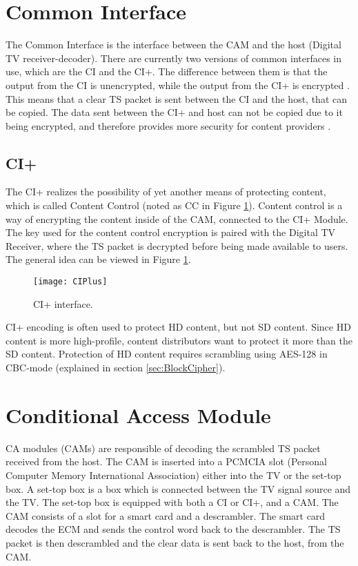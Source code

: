 \section{Common Interface} \label{sec:CI}
The Common Interface is the interface between the CAM and the host 
(Digital TV receiver-decoder). There are currently two versions of 
common interfaces in use, which are the CI and the CI+. The difference 
between them is that the output from the CI is unencrypted, while the 
output from the CI+ is encrypted \citep{CI+:2011}. This means that a 
clear TS packet is sent between the CI and the host, that can be 
copied. The data sent between the CI+ and host can not be copied due 
to it being encrypted, and therefore provides more security for 
content providers \citep{CI:1997}.

\subsection{CI+}
The CI+ realizes the possibility of yet another means of protecting 
content, which is called Content Control (noted as CC in Figure 
\ref{img:CIPlus}). Content control is a way of encrypting the content 
inside of the CAM, connected to the CI+ Module. The key used for the 
content control encryption is paired with the Digital TV Receiver, 
where the TS packet is decrypted before being made available to users. 
The general idea can be viewed in Figure \ref{img:CIPlus}.

\begin{figure}[h!]
  \centering
  \texttt{[image: CIPlus]}
  \caption{CI+ interface. \citep[p. 10]{CI+:2011}}
  \label{img:CIPlus}
\end{figure}

CI+ encoding is often used to protect HD content, but not SD 
content. Since HD content is more high-profile, content distributors 
want to protect it more than the SD content. Protection of HD content 
requires scrambling using AES-128 in CBC-mode (explained in section 
\ref{sec:BlockCipher}). \citep{CI+:2011, CI+:2011_2}

\section{Conditional Access Module}\label{sec:CAM}
CA modules (CAMs) are responsible of decoding the scrambled TS packet
received from the host. The CAM is inserted into a PCMCIA slot 
(Personal Computer Memory International Association) either into the 
TV or the set-top box. A set-top box is a box which is connected 
between the TV signal source and the TV. The set-top box is equipped 
with both a CI or CI+, and a CAM. The CAM consists of a slot for a 
smart card and a descrambler. The smart card decodes the ECM and sends 
the control word back to the descrambler. The TS packet is then 
descrambled and the clear data is sent back to the host, from the CAM.
